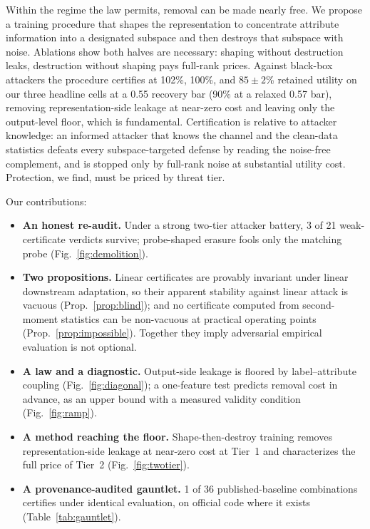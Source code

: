 \documentclass[letterpaper]{article} %
\begin{document}
Within the regime the law permits, removal can be made nearly free. We propose a training procedure that shapes the representation to concentrate attribute information into a designated subspace and then destroys that subspace with noise. Ablations show both halves are necessary: shaping without destruction leaks, destruction without shaping pays full-rank prices. Against black-box attackers the procedure certifies at 102\%, 100\%, and $85\pm2$\% retained utility on our three headline cells at a 0.55 recovery bar (90\% at a relaxed 0.57 bar), removing representation-side leakage at near-zero cost and leaving only the output-level floor, which is fundamental. Certification is relative to attacker knowledge: an informed attacker that knows the channel and the clean-data statistics defeats every subspace-targeted defense by reading the noise-free complement, and is stopped only by full-rank noise at substantial utility cost. Protection, we find, must be priced by threat tier.

Our contributions:
\begin{itemize}
    \item \textbf{An honest re-audit.} Under a strong two-tier attacker battery, 3 of 21 weak-certificate verdicts survive; probe-shaped erasure fools only the matching probe (Fig.~\ref{fig:demolition}).
    \item \textbf{Two propositions.} Linear certificates are provably invariant under linear downstream adaptation, so their apparent stability against linear attack is vacuous (Prop.~\ref{prop:blind}); and no certificate computed from second-moment statistics can be non-vacuous at practical operating points (Prop.~\ref{prop:impossible}). Together they imply adversarial empirical evaluation is not optional.
    \item \textbf{A law and a diagnostic.} Output-side leakage is floored by label--attribute coupling (Fig.~\ref{fig:diagonal}); a one-feature test predicts removal cost in advance, as an upper bound with a measured validity condition (Fig.~\ref{fig:ramp}).
    \item \textbf{A method reaching the floor.} Shape-then-destroy training removes representation-side leakage at near-zero cost at Tier~1 and characterizes the full price of Tier~2 (Fig.~\ref{fig:twotier}).
    \item \textbf{A provenance-audited gauntlet.} 1 of 36 published-baseline combinations certifies under identical evaluation, on official code where it exists (Table~\ref{tab:gauntlet}).
\end{itemize}
\end{document}
